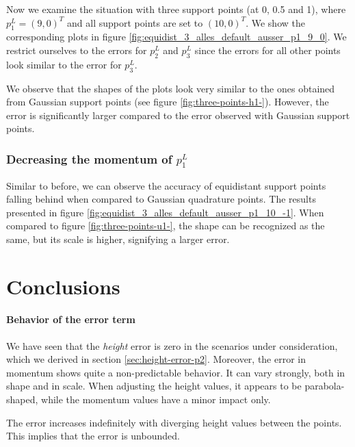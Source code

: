 \documentclass[a4paper, twoside]{article}
\begin{document}
Now we examine the situation with three support points (at 0, 0.5 and 1), where $p_1^L=(9,0)^T$ and all support points are set to $(10,0)^T$. We show the corresponding plots in figure \ref{fig:equidist_3_alles_default_ausser_p1_9_0}. We restrict ourselves to the errors for $p_2^L$ and $p_3^L$ since the errors for all other points look similar to the error for $p_3^L$.



We observe that the shapes of the plots look very similar to the ones obtained from Gaussian support points (see figure \ref{fig:three-points-h1-}). However, the error is significantly larger compared to the error observed with Gaussian support points.

\subsubsection{Decreasing the momentum of $p_1^L$}
\label{sec:equidist-3-on-point-var-decr-momentum-p1}



Similar to before, we can observe the accuracy of equidistant support points falling behind when compared to Gaussian quadrature points.
The results presented in figure \ref{fig:equidist_3_alles_default_ausser_p1_10_-1}.
When compared to figure \ref{fig:three-points-u1-}, the shape can be recognized as the same, but its scale is higher, signifying a larger error.

\clearpage{}

\section{Conclusions}
\label{sec:conslusions}

\paragraph{Behavior of the error term}

We have seen that the \emph{height} error is zero in the scenarios under consideration, which we derived in section \ref{sec:height-error-p2}.
Moreover, the error in momentum shows quite a non-predictable behavior.
It can vary strongly, both in shape and in scale.
When adjusting the height values, it appears to be parabola-shaped, while the momentum values have a minor impact only.

The error increases indefinitely with diverging height values between the points.
This implies that the error is unbounded.
\end{document}
